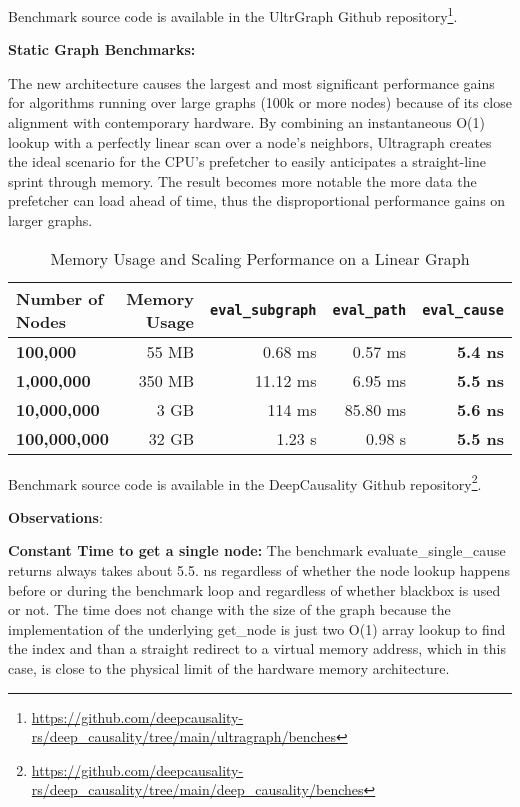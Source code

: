 Benchmark source code is available in the UltrGraph Github repository\footnote{\url{https://github.com/deepcausality-rs/deep_causality/tree/main/ultragraph/benches}}.


\textbf{Static Graph Benchmarks:}

The new architecture causes the largest and most significant performance gains for algorithms running over large graphs (100k or more nodes) because of its close alignment with contemporary hardware.
By combining an instantaneous O(1) lookup with a perfectly linear scan over a node's neighbors, Ultragraph creates the ideal scenario for the CPU's prefetcher to easily anticipates a straight-line sprint through memory. The result becomes more notable the more data the prefetcher can load ahead of time, thus the disproportional performance gains on larger graphs.

\begin{table}[h!]
\centering
\caption{Memory Usage and Scaling Performance on a Linear Graph}
\label{tab:memory-scaling}
\begin{tabular}{lrrrr}
\toprule
\textbf{Number of Nodes} & \textbf{Memory Usage} & \textbf{\texttt{eval\_subgraph}} & \textbf{\texttt{eval\_path}} & \textbf{\texttt{eval\_cause}} \\
\midrule
\textbf{100,000}         & 55 MB                 & 0.68 ms                         & 0.57 ms                      & \textbf{5.4 ns}               \\
\textbf{1,000,000}       & 350 MB                & 11.12 ms                        & 6.95 ms                      & \textbf{5.5 ns}               \\
\textbf{10,000,000}      & 3 GB                  & 114 ms                          & 85.80 ms                     & \textbf{5.6 ns}               \\
\textbf{100,000,000}     & 32 GB                 & 1.23 s                          & 0.98 s                       & \textbf{5.5 ns}               \\
\bottomrule
\end{tabular}
\end{table}

Benchmark source code is available in the DeepCausality Github repository\footnote{\url{https://github.com/deepcausality-rs/deep_causality/tree/main/deep_causality/benches}}.

\textbf{Observations}:

\textbf{Constant Time to get a single node:} The benchmark evaluate\_single\_cause returns always takes about 5.5. ns regardless of
 whether the node lookup happens before or during the benchmark loop and regardless of whether blackbox is used or not. 
 The time does not change with the size of the graph because the implementation of the underlying get\_node is just two O(1) array lookup 
 to find the index and than a straight redirect to a virtual memory address, which in this case, is close to the physical limit of the hardware memory architecture. 


